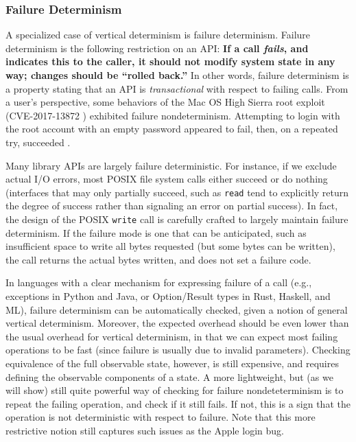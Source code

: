 \subsubsection{Failure Determinism}

A specialized case of vertical determinism is failure determinism.
Failure determinism is the following restriction on an API: {\bf If a call \emph{fails}, and indicates this to the caller, it should not modify system
  state in any way; changes should be ``rolled back.''}   In other words, failure determinism is a property stating that an API
is \emph{transactional} with respect to failing calls.  From a user's perspective, some behaviors of the Mac OS High Sierra
root exploit (CVE-2017-13872 \cite{applebug0}) exhibited failure
nondeterminism.  Attempting to login with the root account with an
empty password appeared to fail, then, on a repeated try, succeeded
\cite{applebug1,applebug2}. 

Many library APIs are largely failure deterministic.  For instance, if
we exclude actual I/O errors, most POSIX file system calls either
succeed or do nothing (interfaces that may only partially succeed,
such as {\tt read} tend to explicitly return the degree of success
rather than signaling an error on partial success).  In fact, the
design of the POSIX {\tt write} call is carefully crafted to largely maintain
failure determinism.  If the failure mode is one that can be
anticipated, such as insufficient space to write all bytes requested
(but some bytes can be written), the call returns the actual bytes
written, and does not set a failure code.

In languages with a clear mechanism for expressing failure of a call
(e.g., exceptions in Python and Java, or Option/Result types in Rust,
Haskell, and ML), failure determinism can be automatically checked,
given a notion of general vertical determinism.
Moreover, the expected overhead should be even lower than the usual
overhead for vertical determinism, in that we can expect most failing
operations to be fast (since failure is usually
due to invalid parameters).  Checking equivalence of the full
observable state, however, is still expensive, and requires defining
the observable components of a state.  A more lightweight, but (as we
will show) still quite powerful way of checking for failure nondeteterminism is to
repeat the failing operation, and check if it still fails.  If not,
this is a sign that the operation is not deterministic with respect to
failure.  Note that this more restrictive notion still captures such issues as the Apple login bug. 

